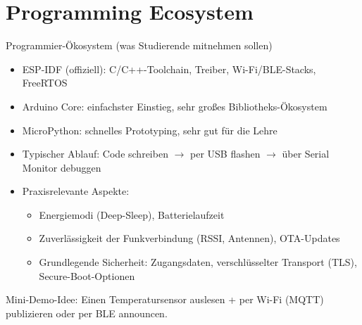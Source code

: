 \section[nosectionpage]{Programming Ecosystem}
\begin{frame}{Programmier-Ökosystem (was Studierende mitnehmen sollen)}
\begin{itemize}
\item \alert{ESP-IDF (offiziell)}: C/C++-Toolchain, Treiber, Wi-Fi/BLE-Stacks, FreeRTOS
\item \alert{Arduino Core}: einfachster Einstieg, sehr großes Bibliotheks-Ökosystem
\item \alert{MicroPython}: schnelles Prototyping, sehr gut für die Lehre
\item Typischer Ablauf: Code schreiben \(\rightarrow\) per USB flashen \(\rightarrow\) über Serial Monitor debuggen
\item Praxisrelevante Aspekte:
    \begin{itemize}
\item Energiemodi (Deep-Sleep), Batterielaufzeit
\item Zuverlässigkeit der Funkverbindung (RSSI, Antennen), OTA-Updates
\item Grundlegende Sicherheit: Zugangsdaten, verschlüsselter Transport (TLS), Secure-Boot-Optionen
    \end{itemize}
\end{itemize}
\vspace{0.3em}
\footnotesize
Mini-Demo-Idee: Einen Temperatursensor auslesen + per Wi-Fi (MQTT) publizieren oder per BLE announcen.
\end{frame}

